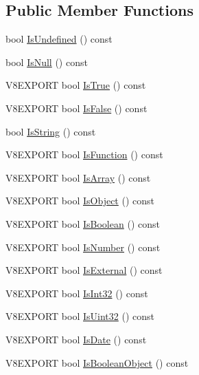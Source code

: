 \subsection*{Public Member Functions}
\begin{DoxyCompactItemize}
\item 
bool \hyperlink{classv8_1_1_value_aea287b745656baa8a12a2ae1d69744b6}{Is\+Undefined} () const 
\item 
bool \hyperlink{classv8_1_1_value_aa2c6ed8ef832223a7e2cd81e6ac61c78}{Is\+Null} () const 
\item 
V8\+E\+X\+P\+O\+R\+T bool \hyperlink{classv8_1_1_value_ae93277798682f4be9adc204a16c40591}{Is\+True} () const 
\item 
V8\+E\+X\+P\+O\+R\+T bool \hyperlink{classv8_1_1_value_a265c208159ff3163ecda1e9f71b99115}{Is\+False} () const 
\item 
bool \hyperlink{classv8_1_1_value_ab23a34b7df62806808e01b0908bf5f00}{Is\+String} () const 
\item 
V8\+E\+X\+P\+O\+R\+T bool \hyperlink{classv8_1_1_value_a33f329c93a9f417e2d05b438e6e5429c}{Is\+Function} () const 
\item 
V8\+E\+X\+P\+O\+R\+T bool \hyperlink{classv8_1_1_value_a95c39ad189c09630dd90ee5c1a7e89a1}{Is\+Array} () const 
\item 
V8\+E\+X\+P\+O\+R\+T bool \hyperlink{classv8_1_1_value_a360f1fe4a8ee74382f571a12eb14a222}{Is\+Object} () const 
\item 
V8\+E\+X\+P\+O\+R\+T bool \hyperlink{classv8_1_1_value_a6baff625780eac51413f2392250e81be}{Is\+Boolean} () const 
\item 
V8\+E\+X\+P\+O\+R\+T bool \hyperlink{classv8_1_1_value_a32003b217768f535a4728bbd16ebd7d5}{Is\+Number} () const 
\item 
V8\+E\+X\+P\+O\+R\+T bool \hyperlink{classv8_1_1_value_a7aed90ede9bf48b10f18cdb97d50fd1e}{Is\+External} () const 
\item 
V8\+E\+X\+P\+O\+R\+T bool \hyperlink{classv8_1_1_value_a70d4afaccc7903e6a01f40a46ad04188}{Is\+Int32} () const 
\item 
V8\+E\+X\+P\+O\+R\+T bool \hyperlink{classv8_1_1_value_a2674a47b2550eb456a7ecfaf09d2f97e}{Is\+Uint32} () const 
\item 
V8\+E\+X\+P\+O\+R\+T bool \hyperlink{classv8_1_1_value_abcdd87539238a68f8337bae7d0a9c1ac}{Is\+Date} () const 
\item 
V8\+E\+X\+P\+O\+R\+T bool \hyperlink{classv8_1_1_value_aebb6cd7cbb34771df1973aef2e544931}{Is\+Boolean\+Object} () const 
\item 

\end{DoxyCompactItemize}
